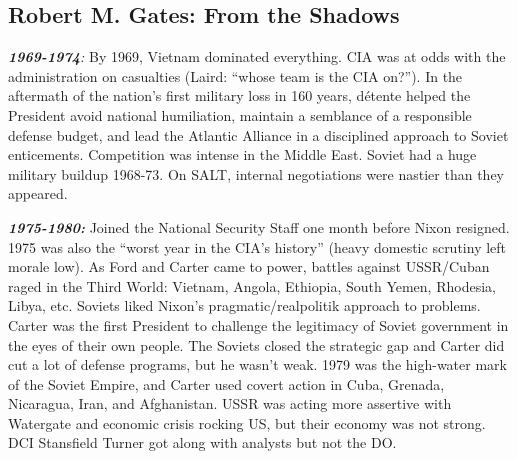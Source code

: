 \documentclass[
]{article}
\begin{document}
\hypertarget{robert-m.-gates-from-the-shadows}{%
\subsection{Robert M. Gates: From the
Shadows}\label{robert-m.-gates-from-the-shadows}}

\emph{\textbf{1969-1974}:} By 1969, Vietnam dominated everything. CIA
was at odds with the administration on casualties (Laird: ``whose team
is the CIA on?''). In the aftermath of the nation's first military loss
in 160 years, détente helped the President avoid national humiliation,
maintain a semblance of a responsible defense budget, and lead the
Atlantic Alliance in a disciplined approach to Soviet enticements.
Competition was intense in the Middle East. Soviet had a huge military
buildup 1968-73. On SALT, internal negotiations were nastier than they
appeared.

\textbf{\emph{1975-1980:}} Joined the National Security Staff one month
before Nixon resigned. 1975 was also the ``worst year in the CIA's
history'' (heavy domestic scrutiny left morale low). As Ford and Carter
came to power, battles against USSR/Cuban raged in the Third World:
Vietnam, Angola, Ethiopia, South Yemen, Rhodesia, Libya, etc. Soviets
liked Nixon's pragmatic/realpolitik approach to problems. Carter was the
first President to challenge the legitimacy of Soviet government in the
eyes of their own people. The Soviets closed the strategic gap and
Carter did cut a lot of defense programs, but he wasn't weak. 1979 was
the high-water mark of the Soviet Empire, and Carter used covert action
in Cuba, Grenada, Nicaragua, Iran, and Afghanistan. USSR was acting more
assertive with Watergate and economic crisis rocking US, but their
economy was not strong. DCI Stansfield Turner got along with analysts
but not the DO.
\end{document}
